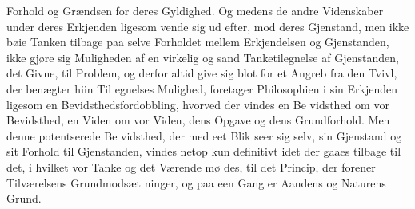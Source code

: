 \documentclass[12pt,a4paper]{book}
\begin{document}
Forhold og Grændsen for deres Gyldighed. Og medens de
andre Videnskaber under deres Erkjenden ligesom vende sig
ud efter, mod deres Gjenstand, men ikke bøie Tanken tilbage
paa selve Forholdet mellem Erkjendelsen og Gjenstanden, ikke
gjøre sig Muligheden af en virkelig og sand Tanketilegnelse
af Gjenstanden, det Givne, til Problem, og derfor altid give
sig blot for et Angreb fra den Tvivl, der benægter hiin Til\-%
egnelses Mulighed, foretager Philosophien i sin Erkjenden
ligesom en Bevidsthedsfordobbling, hvorved der vindes en Be\-%
vidsthed om vor Bevidsthed, en Viden om vor Viden, dens
Opgave og dens Grundforhold. Men denne potentserede Be\-%
vidsthed, der med eet Blik seer sig selv, sin Gjenstand og sit
Forhold til Gjenstanden, vindes netop kun definitivt idet der
gaaes tilbage til det, i hvilket vor Tanke og det Værende mø\-%
des, til det Princip, der forener Tilværelsens Grundmodsæt\-%
ninger, og paa een Gang er Aandens og Naturens Grund.
\end{document}
